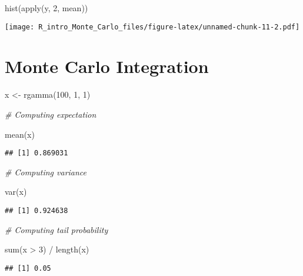 \documentclass[
]{article}
\newenvironment{Shaded}{\begin{snugshade}}{\end{snugshade}}
\newcommand{\CommentTok}[1]{\textcolor[rgb]{0.56,0.35,0.01}{\textit{#1}}}
\newcommand{\DecValTok}[1]{\textcolor[rgb]{0.00,0.00,0.81}{#1}}
\newcommand{\FunctionTok}[1]{\textcolor[rgb]{0.00,0.00,0.00}{#1}}
\newcommand{\NormalTok}[1]{#1}
\newcommand{\OtherTok}[1]{\textcolor[rgb]{0.56,0.35,0.01}{#1}}
\newcommand{\SpecialCharTok}[1]{\textcolor[rgb]{0.00,0.00,0.00}{#1}}
\begin{document}
\begin{Shaded}
\begin{Highlighting}[]
\FunctionTok{hist}\NormalTok{(}\FunctionTok{apply}\NormalTok{(y, }\DecValTok{2}\NormalTok{, mean))}
\end{Highlighting}
\end{Shaded}

\texttt{[image: R\_intro\_Monte\_Carlo\_files/figure-latex/unnamed-chunk-11-2.pdf]}

\hypertarget{monte-carlo-integration}{%
\section{Monte Carlo Integration}\label{monte-carlo-integration}}

\begin{Shaded}
\begin{Highlighting}[]
\NormalTok{x }\OtherTok{\textless{}{-}} \FunctionTok{rgamma}\NormalTok{(}\DecValTok{100}\NormalTok{, }\DecValTok{1}\NormalTok{, }\DecValTok{1}\NormalTok{)}

\CommentTok{\# Computing expectation}

\FunctionTok{mean}\NormalTok{(x)}
\end{Highlighting}
\end{Shaded}

\begin{verbatim}
## [1] 0.869031
\end{verbatim}

\begin{Shaded}
\begin{Highlighting}[]
\CommentTok{\# Computing variance}

\FunctionTok{var}\NormalTok{(x)}
\end{Highlighting}
\end{Shaded}

\begin{verbatim}
## [1] 0.924638
\end{verbatim}

\begin{Shaded}
\begin{Highlighting}[]
\CommentTok{\# Computing tail probability}

\FunctionTok{sum}\NormalTok{(x }\SpecialCharTok{\textgreater{}} \DecValTok{3}\NormalTok{) }\SpecialCharTok{/} \FunctionTok{length}\NormalTok{(x)}
\end{Highlighting}
\end{Shaded}

\begin{verbatim}
## [1] 0.05
\end{verbatim}
\end{document}
